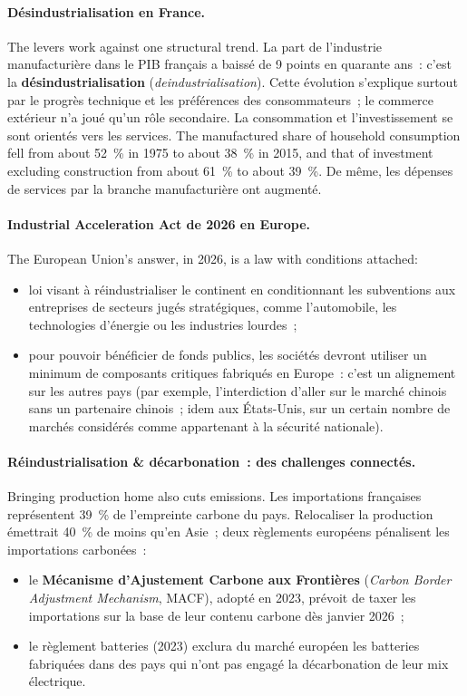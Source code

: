 \paragraph{Désindustrialisation en France.}
The levers work against one structural trend. La part de l'industrie
manufacturière dans le PIB français a baissé de 9 points en quarante ans~: c'est
la \textbf{désindustrialisation} (\textit{deindustrialisation}). Cette évolution
s'explique surtout par le progrès technique et les préférences des
consommateurs~; le commerce extérieur n'a joué qu'un rôle secondaire. La
consommation et l'investissement se sont orientés vers les services. The
manufactured share of household consumption fell from about 52~\% in 1975 to
about 38~\% in 2015, and that of investment excluding construction from about
61~\% to about 39~\%. De même, les dépenses de services par la branche
manufacturière ont augmenté.

\paragraph{Industrial Acceleration Act de 2026 en Europe.}
The European Union's answer, in 2026, is a law with conditions attached:
\begin{itemize}
  \item loi visant à réindustrialiser le continent en conditionnant les
    subventions aux entreprises de secteurs jugés stratégiques, comme
    l'automobile, les technologies d'énergie ou les industries lourdes~;
  \item pour pouvoir bénéficier de fonds publics, les sociétés devront utiliser
    un minimum de composants critiques fabriqués en Europe~: c'est un alignement
    sur les autres pays (par exemple, l'interdiction d'aller sur le marché
    chinois sans un partenaire chinois~; idem aux États-Unis, sur un certain
    nombre de marchés considérés comme appartenant à la sécurité nationale).
\end{itemize}

\paragraph{Réindustrialisation \& décarbonation~: des challenges connectés.}
Bringing production home also cuts emissions. Les importations françaises
représentent 39~\% de l'empreinte carbone du pays. Relocaliser la production
émettrait 40~\% de moins qu'en Asie~; deux règlements européens pénalisent les
importations carbonées~:
\begin{itemize}
  \item le \textbf{Mécanisme d'Ajustement Carbone aux Frontières}
    (\textit{Carbon Border Adjustment Mechanism}, MACF), adopté en 2023, prévoit de
    taxer les importations sur la base de leur contenu carbone dès janvier
    2026~;
  \item le règlement batteries (2023) exclura du marché européen les batteries
    fabriquées dans des pays qui n'ont pas engagé la décarbonation de leur mix
    électrique.
\end{itemize}

